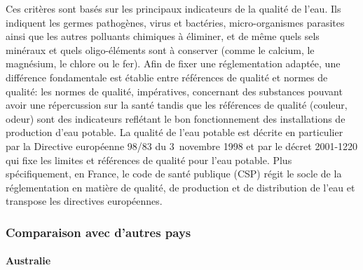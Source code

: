 \documentclass{article}
\begin{document}
Ces critères sont basés sur les principaux indicateurs de la qualité de l’eau. Ils indiquent les  germes pathogènes, virus et bactéries, micro-organismes parasites ainsi que les autres polluants chimiques à éliminer, et de même quels sels minéraux et quels oligo-éléments sont à conserver (comme le calcium, le magnésium, le chlore ou le fer). Afin de fixer une réglementation adaptée, une différence fondamentale est établie entre références de qualité et normes de qualité: les normes de qualité, impératives, concernant des substances pouvant avoir une répercussion sur la santé tandis que les références de qualité (couleur, odeur) sont des indicateurs reflétant le bon fonctionnement des installations de production d’eau potable.
La qualité de l’eau potable est décrite en particulier par la Directive européenne 98/83 du 3~novembre 1998 et par le décret 2001-1220 qui fixe les limites et références de qualité pour l’eau potable. Plus spécifiquement, en France, le code de santé publique (CSP) régit le socle de la réglementation en matière de qualité, de production et de distribution de l’eau et transpose les directives européennes. 

\subsubsection{Comparaison avec d’autres pays}


\paragraph{Australie \\ \\}
\end{document}

